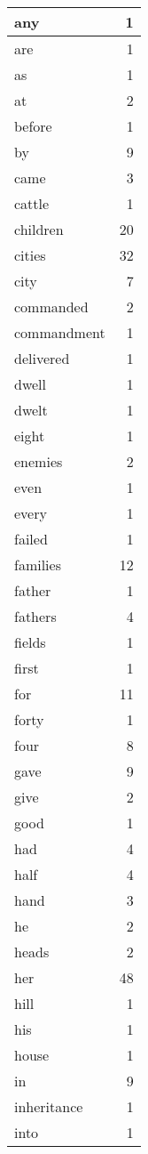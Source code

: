 \begin{center}
\begin{longtable}{l|r}
any & 1\\ \hline 
are & 1\\ \hline 
as & 1\\ \hline 
at & 2\\ \hline 
before & 1\\ \hline 
by & 9\\ \hline 
came & 3\\ \hline 
cattle & 1\\ \hline 
children & 20\\ \hline 
cities & 32\\ \hline 
city & 7\\ \hline 
commanded & 2\\ \hline 
commandment & 1\\ \hline 
delivered & 1\\ \hline 
dwell & 1\\ \hline 
dwelt & 1\\ \hline 
eight & 1\\ \hline 
enemies & 2\\ \hline 
even & 1\\ \hline 
every & 1\\ \hline 
failed & 1\\ \hline 
families & 12\\ \hline 
father & 1\\ \hline 
fathers & 4\\ \hline 
fields & 1\\ \hline 
first & 1\\ \hline 
for & 11\\ \hline 
forty & 1\\ \hline 
four & 8\\ \hline 
gave & 9\\ \hline 
give & 2\\ \hline 
good & 1\\ \hline 
had & 4\\ \hline 
half & 4\\ \hline 
hand & 3\\ \hline 
he & 2\\ \hline 
heads & 2\\ \hline 
her & 48\\ \hline 
hill & 1\\ \hline 
his & 1\\ \hline 
house & 1\\ \hline 
in & 9\\ \hline 
inheritance & 1\\ \hline 
into & 1\\ \hline 

\end{longtable}
\end{center}
